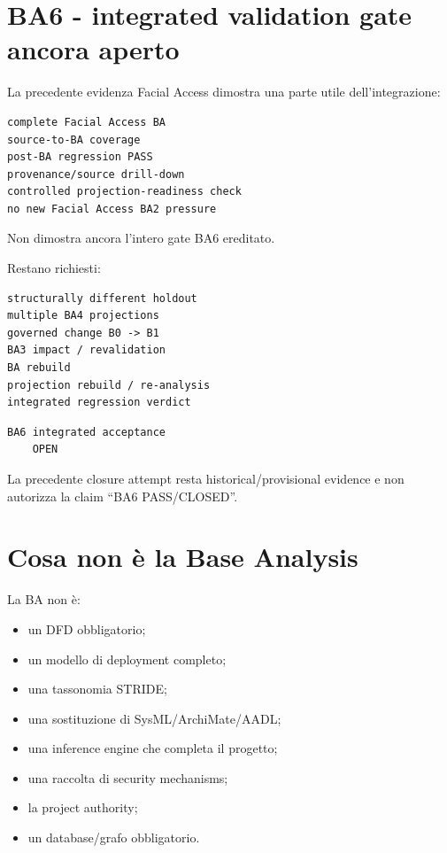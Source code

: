\documentclass[11pt,a4paper]{article}
\begin{document}
\section{BA6 - integrated validation gate ancora aperto}

La precedente evidenza Facial Access dimostra una parte utile dell'integrazione:

\begin{lstlisting}
complete Facial Access BA
source-to-BA coverage
post-BA regression PASS
provenance/source drill-down
controlled projection-readiness check
no new Facial Access BA2 pressure
\end{lstlisting}

Non dimostra ancora l'intero gate BA6 ereditato.

Restano richiesti:

\begin{lstlisting}
structurally different holdout
multiple BA4 projections
governed change B0 -> B1
BA3 impact / revalidation
BA rebuild
projection rebuild / re-analysis
integrated regression verdict
\end{lstlisting}

\begin{openbox}[BA6 status]
\begin{lstlisting}
BA6 integrated acceptance
    OPEN
\end{lstlisting}
La precedente closure attempt resta historical/provisional evidence e non autorizza la claim ``BA6 PASS/CLOSED''.
\end{openbox}

\section{Cosa non è la Base Analysis}

La BA non è:

\begin{itemize}
\item un DFD obbligatorio;
\item un modello di deployment completo;
\item una tassonomia STRIDE;
\item una sostituzione di SysML/ArchiMate/AADL;
\item una inference engine che completa il progetto;
\item una raccolta di security mechanisms;
\item la project authority;
\item un database/grafo obbligatorio.
\end{itemize}
\end{document}
